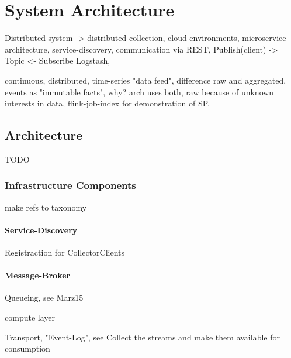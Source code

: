 \chapter{System Architecture}

Distributed system -> distributed collection, cloud environments, microservice architecture,
service-discovery, communication via REST, Publish(client) -> Topic <- Subscribe Logstash,

continuous, distributed, time-series "data feed", difference raw and aggregated\cite{Klepp16},
events as "immutable facts", why?
arch uses both, raw because of unknown interests in data, flink-job-index for demonstration
of SP.

%
%
%
%
\section{Architecture}

TODO

\subsection{Infrastructure Components}

make refs to taxonomy
\subsubsection{Service-Discovery}

Registraction for CollectorClients

\subsubsection{Message-Broker}
Queueing, see Marz15

compute layer

Transport, "Event-Log", see \cite{Kreps13}
Collect the streams and make them available for consumption

